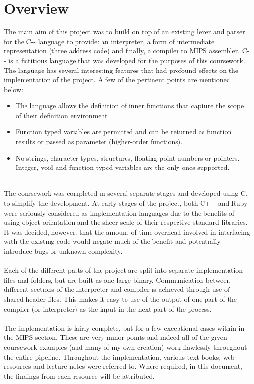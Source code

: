\chapter{Overview}

The main aim of this project was to build on top of an existing lexer and parser for the C-{}- language to provide: an interpreter, a form of intermediate representation (three address code) and finally, a compiler to MIPS assembler. C-{}- is a fictitious language that was developed for the purposes of this coursework. The language has several interesting features that had profound effects on the implementation of the project. A few of the pertinent points are mentioned below:

\begin{itemize}
	\item The language allows the definition of inner functions that capture the scope of their definition environment
	\item Function typed variables are permitted and can be returned as function results or passed as parameter (higher-order functions).
	\item No strings, character types, structures, floating point numbers or pointers. Integer, void and function typed variables are the only ones supported.
\end{itemize}
\vspace{-0.25cm}\ \\
The coursework was completed in several separate stages and developed using C, to simplify the development. At early stages of the project, both C++ and Ruby were seriously considered as implementation languages due to the benefits of using object orientation and the sheer scale of their respective standard libraries. It was decided, however, that the amount of time-overhead involved in interfacing with the existing code would negate much of the benefit and potentially introduce bugs or unknown complexity.
\ \\ \ \\
Each of the different parts of the project are split into separate implementation files and folders, but are built as one large binary. Communication between different sections of the interpreter and compiler is achieved through use of shared header files. This makes it easy to use of the output of one part of the compiler (or interpreter) as the input in the next part of the process.
\ \\ \ \\
The implementation is fairly complete, but for a few exceptional cases within in the MIPS section. These are very minor points and indeed all of the given coursework examples (and many of my own creation) work flawlessly throughout the entire pipeline. Throughout the implementation, various text books, web resources and lecture notes were referred to. Where required, in this document, the findings from each resource will be attributed.

